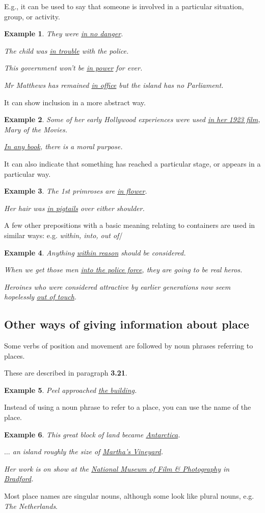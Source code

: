 \documentclass[oneside]{book}
\numberwithin{equation}{section}
\newtheorem{example}{Example}[section]
\begin{document}
E.g., it can be used to say that someone is involved in a particular situation, group, or activity.
\begin{example}
    They were \underline{in no danger}.
    
    The child was \underline{in trouble} with the police.
    
    This government won't be \underline{in power} for ever.
    
    Mr Matthews has remained \underline{in office} but the island has no Parliament.
\end{example}
It can show inclusion in a more abstract way.
\begin{example}
    Some of her early Hollywood experiences were used \underline{in her 1923 film}, Mary of the Movies.
    
    \underline{In any book}, there is a moral purpose.
\end{example}
It can also indicate that something has reached a particular stage, or appears in a particular way.
\begin{example}
    The 1st primroses are \underline{in flower}.
    
    Her hair was \underline{in pigtails} over either shoulder.
\end{example}
A few other prepositions with a basic meaning relating to containers are used in similar ways: e.g. \textit{within, into, out of}/
\begin{example}
    Anything \underline{within reason} should be considered.
    
    When we get those men \underline{into the police force}, they are going to be real heros.
    
    Heroines who were considered attractive by earlier generations now seem hopelessly \underline{out of touch}.
\end{example}

\subsection{Other ways of giving information about place}
\noindent{} Some verbs of position and movement are followed by noun phrases referring to places.

These are described in paragraph \textbf{3.21}.
\begin{example}
    Peel approached \underline{the building}.
\end{example}
%
\noindent{} Instead of using a noun phrase to refer to a place, you can use the name of the place.
\begin{example}
    This great block of land became \underline{Antarctica}.
    
    $\ldots$ an island roughly the size of \underline{Martha's Vineyard}.
    
    Her work is on show at the \underline{National Museum of Film \& Photography} in \underline{Bradford}.
\end{example}
%
\noindent{} Most place names are singular nouns, although some look like plural nouns, e.g. \textit{The Netherlands}.
\end{document}

